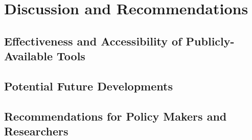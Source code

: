 
\chapter{Discussion and Recommendations}\label{chapter:discussion}

\section{Effectiveness and Accessibility of Publicly-Available Tools}\label{chapter:accessibility}
\section{Potential Future Developments}\label{chapter:potential}
\section{Recommendations for Policy Makers and Researchers}\label{chapter:recommendations}
